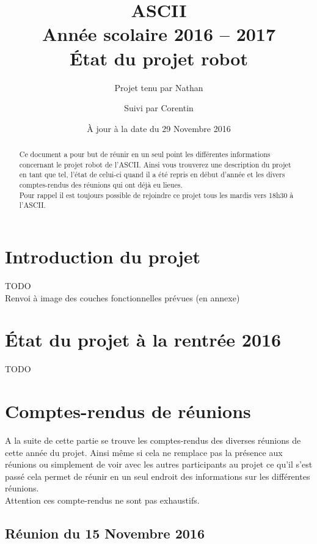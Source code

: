 \documentclass{article}
\title{ASCII\\
Année scolaire 2016 -- 2017\\
État du projet robot}
\date{\`A jour à la date du 29 Novembre 2016}
\author{Projet tenu par Nathan \bsc{Touroux} \and Suivi par Corentin \bsc{Chédotal}}
\begin{document}
\maketitle

\begin{abstract}
    Ce document a pour but de réunir en un seul point les différentes informations concernant le projet robot de l'ASCII. Ainsi vous trouverez une description du projet en tant que tel, l'état de celui-ci quand il a été repris en début d'année et les divers comptes-rendus des réunions qui ont déjà eu lieues.\\
    Pour rappel il est toujours possible de rejoindre ce projet tous les mardis vers 18h30 à l'ASCII.
\end{abstract}

\newpage

\tableofcontents

\newpage

\section{Introduction du projet}

    TODO\\
    Renvoi à image des couches fonctionnelles prévues (en annexe)
    
\section{État du projet à la rentrée 2016}

    TODO
    
\section{Comptes-rendus de réunions}

    A la suite de cette partie se trouve les comptes-rendus des diverses réunions de cette année du projet. Ainsi même si cela ne remplace pas la présence aux réunions ou simplement de voir avec les autres participants au projet ce qu'il s'est passé cela permet de réunir en un seul endroit des informations sur les différentes réunions.\\ 
    Attention ces compte-rendus ne sont pas exhaustifs.

    \subsection{Réunion du 15 Novembre 2016}
    
\end{document}
